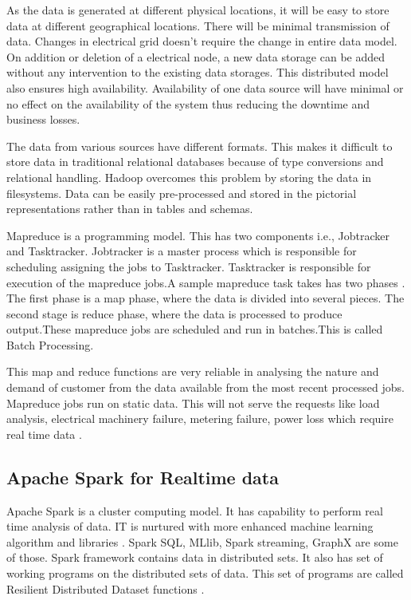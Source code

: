 \documentclass[sigconf]{acmart}
\begin{document}
As the data is generated at different physical locations, it will be easy to store data at different geographical locations. There will be minimal transmission of data. Changes in electrical grid doesn't require the change in entire data model. On addition or deletion of a electrical node, a new data storage can be added without any intervention to the existing data storages. This distributed model also ensures high availability. Availability of one data source will have minimal or no effect on the availability of the system thus reducing the downtime and business losses.

The data from various sources have different formats. This makes it difficult to store data in traditional relational databases because of type conversions and relational handling. Hadoop overcomes this problem by storing the data in filesystems. Data can be easily pre-processed and stored in the pictorial representations rather than in tables and schemas.

Mapreduce is a programming model. This has two components i.e., Jobtracker and Tasktracker. Jobtracker is a master process which is responsible for scheduling assigning the jobs to Tasktracker. Tasktracker is responsible for execution of the mapreduce jobs.A sample mapreduce task takes has two phases \cite{tutorials}. The first phase is a map phase, where the data is divided into several pieces. The second stage is reduce phase, where the data is processed to produce output.These mapreduce jobs are scheduled and run in batches.This is called Batch Processing.

 This map and reduce functions are very reliable in analysing the nature and demand of customer from the data available from the most recent processed jobs. Mapreduce jobs run on static data. This will not serve the requests like load analysis, electrical machinery failure, metering failure, power loss which require real time data \cite{BigDataAnalyticsPlatformforSmartGrid2015}. 

\subsection{Apache Spark for Realtime data}
Apache Spark is a cluster computing model. It has capability to perform real time analysis of data. IT is nurtured with more enhanced machine learning algorithm and libraries \cite{Zaharia}. Spark SQL, MLlib, Spark streaming, GraphX are some of those. Spark framework contains data in distributed sets. It also has set of working programs on the distributed sets of data. This set of programs are called Resilient Distributed Dataset functions \cite{Tu2016}.
\end{document}
